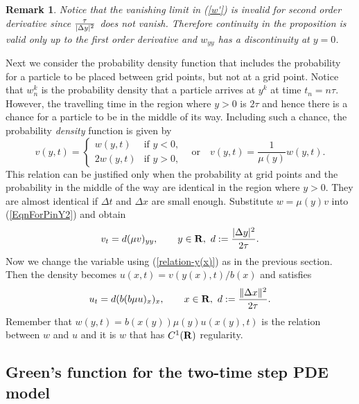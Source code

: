\documentclass[11pt]{amsart}
\def\R{{\bf R}}
\def\d{d}
\def\R{{\bf R}}
\def\bfR{{\bf R}}
\newtheorem{remark}{Remark}[section]
\begin{document}
\begin{remark}
Notice that the vanishing limit in (\ref{w'}) is invalid for second order derivative since ${\tau\over|\Delta y|^2}$ does not vanish. Therefore continuity in the proposition is valid only up to the first order derivative and $w_{yy}$ has a discontinuity at $y=0$.
\end{remark}

Next we consider the probability density function that includes the probability for a particle to be placed between grid points, but not at a grid point. Notice that $w_n^k$ is the probability density that a particle arrives at $y^k$ at time $t_n=n\tau$. However, the travelling time in the region where $y>0$ is $2\tau$ and hence there is a chance for a particle to be in the middle of its way. Including such a chance, the probability \emph{density} function is given by
\begin{equation*}\label{density}
v(y,t)=
\begin{cases}
w(y,t) & \text{if $y<0$,}\\
2w(y,t) & \text{if $y>0$,}
\end{cases}
\quad \text{or}\quad v(y,t)=\frac{1}{\mu(y)}w(y,t).
\end{equation*}
This relation can be justified only when the probability at grid points and the probability in the middle of the way are identical in the region where $y>0$. They are almost identical if $\Delta t$ and $\Delta x$ are small enough. Substitute $w=\mu(y)v$ into (\ref{EqnForPinY2}) and obtain
\begin{equation*}\label{EqnForUinY2}
v_t=\d (\mu v)_{yy},\qquad y\in\bfR,\ \d:={|\Delta y|^2\over 2\tau}.
\end{equation*}
Now we change the variable using (\ref{relation-y(x)}) as in the previous section. Then the density becomes $u(x,t)=v(y(x),t)/b(x)$ and satisfies
\begin{equation}\label{EqnForUinX2}
u_t=\d (b(b\mu u)_{x})_{x},\qquad x\in\bfR,\ \d:={\|\Delta x\|^2\over 2\tau}.
\end{equation}
Remember that $w(y,t)=b(x(y))\mu(y)u(x(y),t)$ is the relation between $w$ and $u$ and it is $w$ that has $C^1(\R)$ regularity.

\subsection{Green's function for the two-time step PDE model} \label{sect.explicit}
\end{document}
